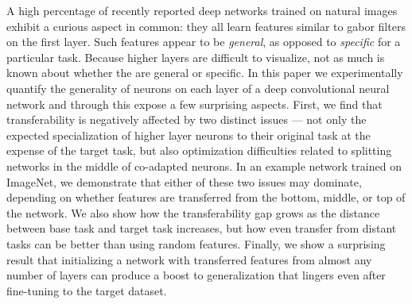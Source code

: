 
A high percentage of recently reported deep networks trained on
natural images exhibit a curious aspect in common: they all learn
features similar to gabor filters on the first layer. Such features
appear to be \emph{general}, as opposed to \emph{specific} for a
particular task. Because higher layers are difficult to visualize, not
as much is known about whether the are general or specific. In this
paper we experimentally quantify the generality of neurons on each
layer of a deep convolutional neural network and through this expose a
few surprising aspects. First, we find that transferability is
negatively affected by two distinct issues --- not only the expected
specialization of higher layer neurons to their original task at the
expense of the target task, but also optimization difficulties related
to splitting networks in the middle of co-adapted neurons. In an
example network trained on ImageNet, we demonstrate that either of
these two issues may dominate, depending on whether features are
transferred from the bottom, middle, or top of the network.  We also
show how the transferability gap grows as the distance between base
task and target task increases, but how even transfer from distant
tasks can be better than using random features. Finally, we show a
surprising result that initializing a network with transferred
features from almost any number of layers can produce a boost to
generalization that lingers even after fine-tuning to the target
dataset.









